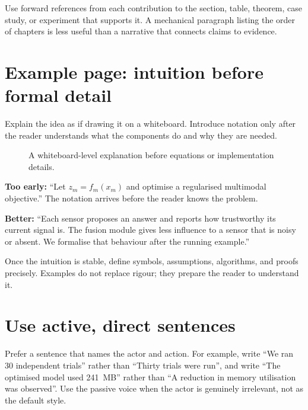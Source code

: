 Use forward references from each contribution to the section, table, theorem,
case study, or experiment that supports it. A mechanical paragraph listing the
order of chapters is less useful than a narrative that connects claims to
evidence.

\section{Example page: intuition before formal detail}
Explain the idea as if drawing it on a whiteboard. Introduce notation only after
the reader understands what the components do and why they are needed.

\begin{figure}[htbp]
\centering
{}
\pipelinearrow
{}
\pipelinearrow
{}
\pipelinearrow
{}
\caption{A whiteboard-level explanation before equations or implementation details.}
\label{fig:guide-intuition-en}
\end{figure}

\begin{keypoint}
\textbf{Too early:} ``Let $z_m=f_m(x_m)$ and optimise a regularised multimodal
objective.'' The notation arrives before the reader knows the problem.\par
\textbf{Better:} ``Each sensor proposes an answer and reports how trustworthy
its current signal is. The fusion module gives less influence to a sensor that
is noisy or absent. We formalise that behaviour after the running example.''
\end{keypoint}

Once the intuition is stable, define symbols, assumptions, algorithms, and
proofs precisely. Examples do not replace rigour; they prepare the reader to
understand it.

\section{Use active, direct sentences}
Prefer a sentence that names the actor and action. For example, write ``We ran
30 independent trials'' rather than ``Thirty trials were run'', and write ``The
optimised model used 241~MB'' rather than ``A reduction in memory utilisation
was observed''. Use the passive voice when the actor is genuinely irrelevant,
not as the default style.

